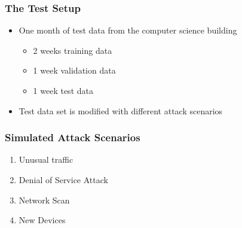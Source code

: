 \begin{frame}[c]
	\frametitle{The Test Setup}
	
	\begin{itemize}
		\item One month of test data from the computer science building
			\begin{itemize}
				\item 2 weeks training data
				\item 1 week validation data
				\item 1 week test data
			\end{itemize}
		\item Test data set is modified with different attack scenarios
	\end{itemize}

\end{frame}

\begin{frame}[c]
	\frametitle{Simulated Attack Scenarios}
	
	\begin{enumerate}
		\item Unusual traffic
		\item Denial of Service Attack
		\item Network Scan
		\item New Devices
	\end{enumerate}
	
\end{frame}


